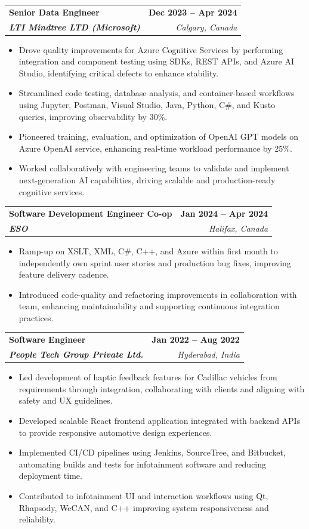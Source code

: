 \documentclass[letterpaper,11pt]{article}
\makeatletter
\newcommand{\resumeItem}[1]{
  \item\small{
    {#1 \vspace{-2pt}}
  }
}
\newcommand{\resumeSubheading}[4]{
  \vspace{-2pt}\item
    \begin{tabular*}{1.0\textwidth}[t]{l@{\extracolsep{\fill}}r}
      \textbf{#1} & \textbf{\small #2} \\
      \textit{\small#3} & \textit{\small #4} \\
    \end{tabular*}\vspace{-7pt}
}
\newcommand{\resumeItemListStart}{\begin{itemize}}
\newcommand{\resumeItemListEnd}{\end{itemize}\vspace{-5pt}}
\makeatother
\begin{document}
    \resumeSubheading
      {\textbf{Senior Data Engineer}}{\textbf{Dec 2023 -- Apr 2024}}
      {\textbf{LTI Mindtree LTD (Microsoft)}}{Calgary, Canada}
      \resumeItemListStart
        \resumeItem{Drove quality improvements for Azure Cognitive Services by performing integration and component testing using SDKs, REST APIs, and Azure AI Studio, identifying critical defects to enhance stability.}
        \resumeItem{Streamlined code testing, database analysis, and container-based workflows using Jupyter, Postman, Visual Studio, Java, Python, C\#, and Kusto queries, improving observability by 30\%.}
        \resumeItem{Pioneered training, evaluation, and optimization of OpenAI GPT models on Azure OpenAI service, enhancing real-time workload performance by 25\%.}
        \resumeItem{Worked collaboratively with engineering teams to validate and implement next-generation AI capabilities, driving scalable and production-ready cognitive services.}
      \resumeItemListEnd
    
    \resumeSubheading
      {\textbf{Software Development Engineer Co-op}}{\textbf{Jan 2024 -- Apr 2024}}
      {\textbf{ESO}}{Halifax, Canada}
      \resumeItemListStart
        \resumeItem{Ramp-up on XSLT, XML, C\#, C++, and Azure within first month to independently own sprint user stories and production bug fixes, improving feature delivery cadence.}
        \resumeItem{Introduced code-quality and refactoring improvements in collaboration with team, enhancing maintainability and supporting continuous integration practices.}
      \resumeItemListEnd

    \resumeSubheading
      {\textbf{Software Engineer}}{\textbf{Jan 2022 -- Aug 2022}}
      {\textbf{People Tech Group Private Ltd.}}{Hyderabad, India}
      \resumeItemListStart
        \resumeItem{Led development of haptic feedback features for Cadillac vehicles from requirements through integration, collaborating with clients and aligning with safety and UX guidelines.}
        \resumeItem{Developed scalable React frontend application integrated with backend APIs to provide responsive automotive design experiences.}
        \resumeItem{Implemented CI/CD pipelines using Jenkins, SourceTree, and Bitbucket, automating builds and tests for infotainment software and reducing deployment time.}
        \resumeItem{Contributed to infotainment UI and interaction workflows using Qt, Rhapsody, WeCAN, and C++ improving system responsiveness and reliability.}
      \resumeItemListEnd
\end{document}
